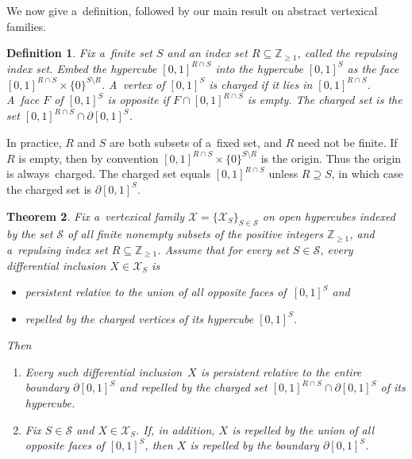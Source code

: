 \documentclass[11pt]{article}
\newtheorem{Theorem}{Theorem}[section]
\newtheorem{Definition}[Theorem]{Definition}
\begin{document}
We now give a~def\/inition, followed by our main result on abstract vertexical families.
\begin{Definition}
\label{d:charged}
Fix a~f\/inite set $S$ and an index set $R\subseteq\mathbb{Z}_{\geq1}$, called the \emph{repulsing index set}.
Embed the hypercube $[0,1]^{R\cap S}$ into the hypercube $[0,1]^S$ as the face $[0,1]^{R\cap S}\times\{0\}^{S\setminus
R}$.
A~vertex of $[0,1]^S$ is \emph{charged} if it lies in $[0,1]^{R\cap S}$.
A~face $F$ of $[0,1]^S$ is \emph{opposite} if $F\cap[0,1]^{R\cap S}$ is empty.
The \emph{charged set} is the set $[0,1]^{R\cap S}\cap\partial[0,1]^S$.
\end{Definition}

In practice, $R$ and $S$ are both subsets of a~f\/ixed set, and $R$ need not be f\/inite.
If $R$ is empty, then by convention $[0,1]^{R\cap S}\times\{0\}^{S\setminus R}$ is the origin.
Thus the origin is always~charged.
The charged set equals $[0,1]^{R\cap S}$ unless $R\supseteq S$, in which case the charged set is $\partial[0,1]^S$.
\begin{Theorem}
\label{t:vertexical}
Fix a~vertexical family $\mathcal X=\{\mathcal X_S\}_{S\in\mathcal S}$ on open hypercubes indexed by the set $\mathcal
S$ of all finite nonempty subsets of the positive integers $\mathbb{Z}_{\geq1}$, and a~repulsing index set
$R\subseteq\mathbb{Z}_{\geq1}$.
Assume that for every set $S\in\mathcal S$, every differential inclusion $X\in\mathcal X_S$ is
\begin{itemize}\itemsep=-0.5pt
\item persistent relative to the union of all opposite faces of\/~$[0,1]^S$ and \item repelled by the charged vertices
of its hypercube $[0,1]^S$.
\end{itemize}
Then
\begin{enumerate}\itemsep=-0.5pt
\item[$1.$] Every such differential inclusion~$X$ is persistent relative to the entire boundary $\partial[0,1]^S$ and
repelled by the charged set $[0,1]^{R\cap S}\cap\partial[0,1]^S$ of its hypercube.
\item[$2.$] Fix $S\in\mathcal S$ and $X\in\mathcal X_S$.
If, in addition, $X$ is repelled by the union of all opposite faces of\/ $[0,1]^S$, then $X$ is repelled by the
boundary $\partial[0,1]^S$.
\end{enumerate}
\end{Theorem}
\end{document}
